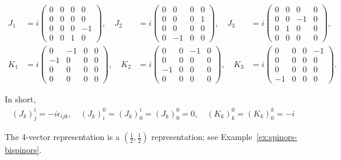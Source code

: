 \begin{example}
    \begin{align*}
        J_1 &= i\begin{pmatrix}
            0 & 0 & 0 & 0 \\
            0 & 0 & 0 & 0 \\
            0 & 0 & 0 & -1 \\
            0 & 0 & 1 & 0
        \end{pmatrix}, \quad
        J_2 &= i\begin{pmatrix}
            0 & 0 & 0 & 0 \\
            0 & 0 & 0 & 1 \\
            0 & 0 & 0 & 0 \\
            0 & -1 & 0 & 0
        \end{pmatrix}, \quad
        J_3 &= i\begin{pmatrix}
            0 & 0 & 0 & 0 \\
            0 & 0 & -1 & 0 \\
            0 & 1 & 0 & 0 \\
            0 & 0 & 0 & 0
        \end{pmatrix}, \\
        K_1 &= i\begin{pmatrix}
            0 & -1 & 0 & 0 \\
            -1 & 0 & 0 & 0 \\
            0 & 0 & 0 & 0 \\
            0 & 0 & 0 & 0
        \end{pmatrix}, \quad
        K_2 &= i\begin{pmatrix}
            0 & 0 & -1 & 0 \\
            0 & 0 & 0 & 0 \\
            -1 & 0 & 0 & 0 \\
            0 & 0 & 0 & 0
        \end{pmatrix}, \quad
        K_3 &= i\begin{pmatrix}
            0 & 0 & 0 & -1 \\
            0 & 0 & 0 & 0 \\
            0 & 0 & 0 & 0 \\
            -1 & 0 & 0 & 0
        \end{pmatrix}.
    \end{align*}

    In short,
\begin{align*}
    (J_k)^i_j = - i \epsilon_{ijk}, \quad
    (J_k)^0_i = (J_k)^i_0 = (J_k)^0_0 = 0, \quad
    (K_k)^0_k = (K_k)^k_0 = -i
\end{align*}

The 4-vector representation is a $(\frac{1}{2}, \frac{1}{2})$ representation; see Example~\ref{ex:spinors-bispinors}.
\end{example}

